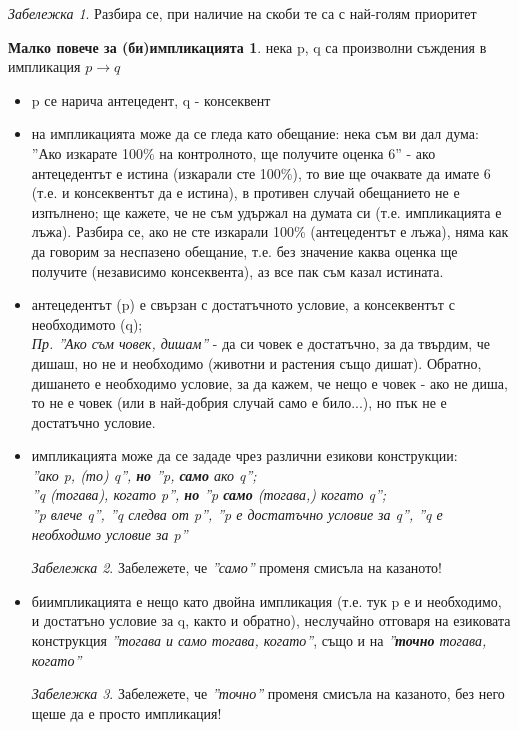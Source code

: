 \documentclass[10pt, a4paper]{article}
\theoremstyle{definition}
\newtheorem*{implication}{Малко повече за (би)импликацията}
\theoremstyle{remark}
\newtheorem*{remark}{Забележка}
\begin{document}
\begin{remark}
    Разбира се, при наличие на скоби те са с най-голям приоритет
\end{remark}
\hfill
\begin{implication}
нека p, q са произволни съждения в импликация \(p\rightarrow q\)
\begin{itemize}
    \item p се нарича антецедент, q - консеквент
    \item на импликацията може да се гледа като обещание: нека съм ви дал дума: ''Ако изкарате 100\% на контролното, ще получите оценка 6'' - ако антецедентът е истина (изкарали сте 100\%), то вие ще очаквате да имате 6 (т.е. и консеквентът да е истина), в противен случай обещанието не е изпълнено; ще кажете, че не съм удържал на думата си (т.е. импликацията е лъжа). Разбира се, ако не сте изкарали 100\% (антецедентът е лъжа), няма как да говорим за неспазено обещание, т.е. без значение каква оценка ще получите (независимо консеквента), аз все пак съм казал истината.
    \item антецедентът (p) е свързан с достатъчното условие, а консеквентът с необходимото (q);\\ \emph{Пр. ''Ако съм човек, дишам''} - да си човек е достатъчно, за да твърдим, че дишаш, но не и необходимо (животни и растения също дишат). Обратно, дишането е необходимо условие, за да кажем, че нещо е човек - ако не диша, то не е човек (или в най-добрия случай само е било...), но пък не е достатъчно условие.
    \item импликацията може да се зададе чрез различни езикови конструкции: \emph{\\''ако p, (то) q'', \textbf{но} ''p, \textbf{само} ако q'';\\ ''q (тогава), когато p'', \textbf{но} ''p \textbf{само} (тогава,) когато q'';\\ ''p влече q'', ''q следва от p'', ''p е достатъчно условие за q'', ''q е необходимо условие за p'' } \\
    \begin{remark}
        Забележете, че \emph{''само''} променя смисъла на казаното!
    \end{remark}    
    \item биимпликацията е нещо като двойна импликация (т.е. тук p е и необходимо, и достатъно условие за q, както и обратно), неслучайно отговаря на езиковата конструкция \emph{''тогава и само тогава, когато''}, също и на \emph{''\textbf{точно} тогава, когато''}\\
    \begin{remark}
        Забележете, че \emph{''точно''} променя смисъла на казаното, без него щеше да е просто импликация!
    \end{remark}   
\end{itemize}

\end{implication}
\end{document}

